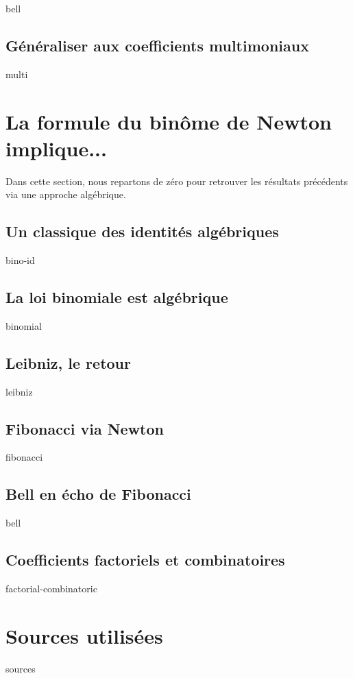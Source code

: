 \documentclass[12pt]{amsart}
\begin{document}
    {bell}
    
    
\subsection{Généraliser aux coefficients multimoniaux}

{multi}




\section{La formule du binôme de Newton implique...}

	Dans cette section, nous repartons de zéro pour retrouver les résultats précédents via une approche algébrique.


    \subsection{Un classique des identités algébriques}
    
    {bino-id}


    \subsection{La loi binomiale est algébrique}
    
    {binomial}
    
    
    \subsection{Leibniz, le retour}
    
    {leibniz}
    
    
    \subsection{Fibonacci via Newton}
    
    {fibonacci}
    
    
    \subsection{Bell en écho de Fibonacci} \label{newton-fibo}
    
    {bell}


    \subsection{Coefficients factoriels et combinatoires}
    
    {factorial-combinatoric}
    



\section{Sources utilisées}

	{sources}
\end{document}
